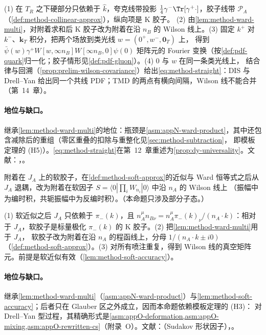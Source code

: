 \begin{proofsketch}
(1) 在 $T_R$ 之下硬部分只依赖于 $\hat k$，夸克线带投影 $\frac14\gamma^-\Tr[\gamma^+\cdot]$，胶子线带 $\mathcal P_A$（\cref{def:method-collinear-approx}），纵向项是 K 胶子。
(2) 由\cref{lem:method-ward-multi}，对附着求和后 K 胶子改为附着在沿 $n_B$ 的 Wilson 线上。(3) 固定 $k^+$ 对 $k^-$、$\mathbf k_T$ 积分，把两个场放到类光线 $w=(0^+,w^-,\mathbf 0_T)$ 上，
得到 $\bar\psi(w)\gamma^+W[w,\infty n_B]W[\infty n_B,0]\psi(0)$ 矩阵元的 Fourier 变换（按\cref{def:pdf-quark}归一化；胶子情形见\cref{def:pdf-gluon}）。(4) $0$ 与 $w$ 在同一条类光线上，
结合律与回溯（\cref{prop:prelim-wilson-covariance}）给出\cref{eq:method-straight}：DIS 与 Drell--Yan 给出同一个共线 PDF；TMD 的两点有横向间隔，Wilson 线不能合并（第~14~章）。
\end{proofsketch}

\paragraph{地位与缺口。}继承\cref{lem:method-ward-multi}的地位：瓶颈是\cref{asm:appN-ward-product}，其中还包含减除后的重组（零区重叠的扣除与重整化见\cref{sec:method-subtraction}，
即模板定理的 (H5)）。\cref{eq:method-straight}在第~12~章重述为\cref{prop:dy-universality}。文献：\cite{CollinsSoper1982a}，\cite[第~11.9~节]{Collins2011}。

\begin{proposition}\label{prop:method-soft-wilson}
附着在 $J_A$ 上的软胶子，在\cref{def:method-soft-approx}的近似与 Ward 恒等式之后从 $J_A$ 退耦，改为附着在软因子 $S=\langle0|\prod_iW_{n_i}|0\rangle$ 中沿 $n_A$ 的 Wilson 线上
（振幅中为编时积，共轭振幅中为反编时积）。（本命题只涉及部分子态。）
\end{proposition}

\begin{proofsketch}
(1) 软近似之后 $J_A$ 只依赖于 $\pi_-(k)$，且 $n_A^\mu n_{B\nu}=n_A^\mu\pi_-(k)_\nu/(n_A\cdot k)$：相对于 $J_A$，软胶子是标量极化 $\pi_-(k)$ 的 K 胶子。(2) 把\cref{lem:method-ward-multi}用于 $J_A$，
软胶子改为附着在沿 $n_A$ 的程函线上，分母 $1/(n_A\cdot k\pm i0)$（\cref{def:method-soft-approx}）。(3) 对所有喷注重复，得到 Wilson 线的真空矩阵元。前提是软近似有效（\cref{lem:method-soft-accuracy}）。
\end{proofsketch}

\paragraph{地位与缺口。}继承\cref{lem:method-ward-multi}（\cref{asm:appN-ward-product}）与\cref{lem:method-soft-accuracy}；后者只在 Glauber 区之外成立，因而本命题依赖模板定理的 (H3)：
对 Drell--Yan 型过程，其精确形式是\cref{asm:appO-deformation,asm:appO-mixing,asm:appO-rewritten-cs}（附录~O）。文献：\cite[第~10.8~节]{Collins2011}（Sudakov 形状因子），\cite{CollinsSoperSterman1989}。

